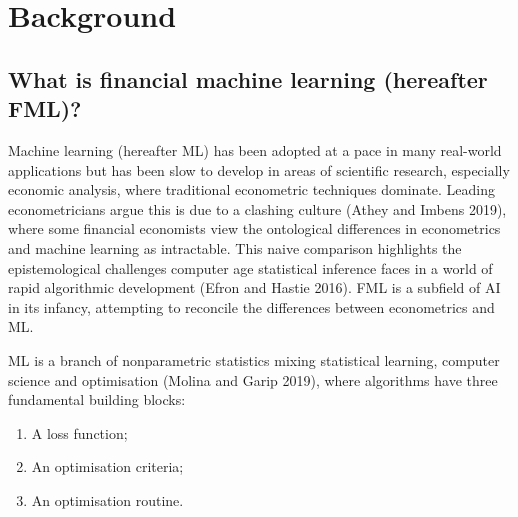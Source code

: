 \documentclass{article}
\begin{document}
\hypertarget{background}{%
\section{Background}\label{background}}

\hypertarget{what-is-financial-machine-learning-hereafter-fml}{%
\subsection{What is financial machine learning (hereafter
FML)?}\label{what-is-financial-machine-learning-hereafter-fml}}

Machine learning (hereafter ML) has been adopted at a pace in many
real-world applications but has been slow to develop in areas of
scientific research, especially economic analysis, where traditional
econometric techniques dominate. Leading econometricians argue this is
due to a clashing culture (Athey and Imbens 2019), where some financial
economists view the ontological differences in econometrics and machine
learning as intractable. This naive comparison highlights the
epistemological challenges computer age statistical inference faces in a
world of rapid algorithmic development (Efron and Hastie 2016). FML is a
subfield of AI in its infancy, attempting to reconcile the differences
between econometrics and ML.

ML is a branch of nonparametric statistics mixing statistical learning,
computer science and optimisation (Molina and Garip 2019), where
algorithms have three fundamental building blocks:

\begin{enumerate}
\def\labelenumi{\arabic{enumi}.}
\tightlist
\item
  A loss function;
\item
  An optimisation criteria;
\item
  An optimisation routine.
\end{enumerate}
\end{document}
